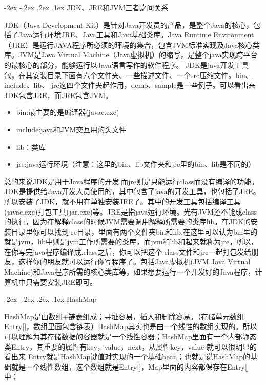 \documentclass[8pt]{book}
\makeatletter
\numberwithin{dummy}{section}
\theoremstyle{ocrenumbox}
\theoremstyle{blacknumex}
\theoremstyle{blacknumbox}
\theoremstyle{ocrenum}
\renewcommand\paragraph{\@startsection{paragraph}{4}{\z@}
	{-2ex \@plus-.2ex \@minus .2ex}
	{.1ex}
	{\normalfont\small\sffamily\bfseries}}
\makeatother
\begin{document}
\paragraph{JDK、JRE和JVM三者之间关系}

JDK（Java Development Kit）是针对Java开发员的产品，是整个Java的核心，包括了Java运行环境JRE、Java工具和Java基础类库。Java Runtime Environment（JRE）是运行JAVA程序所必须的环境的集合，包含JVM标准实现及Java核心类库。JVM是Java Virtual Machine（Java虚拟机）的缩写，是整个java实现跨平台的最核心的部分，能够运行以Java语言写作的软件程序。
JDK是java开发工具包，在其安装目录下面有六个文件夹、一些描述文件、一个src压缩文件。bin、include、lib、 jre这四个文件夹起作用，demo、sample是一些例子。可以看出来JDK包含JRE，而JRE包含JVM。

\begin{itemize}
	\item{bin:最主要的是编译器(javac.exe)}
	\item{include:java和JVM交互用的头文件}
	\item{lib：类库}
	\item{jre:java运行环境（注意：这里的bin、lib文件夹和jre里的bin、lib是不同的）}
\end{itemize}

总的来说JDK是用于Java程序的开发,而jre则是只能运行class而没有编译的功能。JDK是提供给Java开发人员使用的，其中包含了java的开发工具，也包括了JRE。所以安装了JDK，就不用在单独安装JRE了。其中的开发工具包括编译工具(javac.exe)打包工具(jar.exe)等。JRE是指java运行环境。光有JVM还不能成class的执行，因为在解释class的时候JVM需要调用解释所需要的类库lib。在JDK的安装目录里你可以找到jre目录，里面有两个文件夹bin和lib,在这里可以认为bin里的就是jvm，lib中则是jvm工作所需要的类库，而jvm和lib和起来就称为jre。所以，在你写完java程序编译成.class之后，你可以把这个.class文件和jre一起打包发给朋友，这样你的朋友就可以运行你写程序了。包括Java虚拟机(JVM Java Virtual Machine)和Java程序所需的核心类库等，如果想要运行一个开发好的Java程序，计算机中只需要安装JRE即可。

\paragraph{HashMap}

HashMap是由数组+链表组成；寻址容易，插入和删除容易。（存储单元数组Entry[]，数组里面包含链表）HashMap其实也是由一个线性的数组实现的。所以可以理解为其存储数据的容器就是一个线性容器；HashMap里面有一个内部静态类Entry，其重要的属性有key，value，next，从属性key，value 就可以很明显的看出来 Entry就是HashMap键值对实现的一个基础bean；也就是说HashMap的基础就是一个线性数组，这个数组就是Entry[]，Map里面的内容都保存在Entry[]中；
\end{document}
